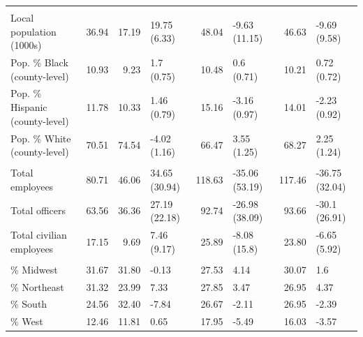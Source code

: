 \begin{table}
\begin{tabular}[t]{lrrlrlrl}
\addlinespace[0.3em]
\multicolumn{8}{l}{\textbf{Population}}\\
\hspace{1em}Local population (1000s) & 36.94 & 17.19 & 19.75 (6.33) & 48.04 & -9.63 (11.15) & 46.63 & -9.69 (9.58)\\
\hspace{1em}Pop. \% Black (county-level) & 10.93 & 9.23 & 1.7 (0.75) & 10.48 & 0.6 (0.71) & 10.21 & 0.72 (0.72)\\
\hspace{1em}Pop. \% Hispanic (county-level) & 11.78 & 10.33 & 1.46 (0.79) & 15.16 & -3.16 (0.97) & 14.01 & -2.23 (0.92)\\
\hspace{1em}Pop. \% White (county-level) & 70.51 & 74.54 & -4.02 (1.16) & 66.47 & 3.55 (1.25) & 68.27 & 2.25 (1.24)\\
\addlinespace[0.3em]
\multicolumn{8}{l}{\textbf{Department size (\# of employees)}}\\
\hspace{1em}Total employees & 80.71 & 46.06 & 34.65 (30.94) & 118.63 & -35.06 (53.19) & 117.46 & -36.75 (32.04)\\
\hspace{1em}Total officers & 63.56 & 36.36 & 27.19 (22.18) & 92.74 & -26.98 (38.09) & 93.66 & -30.1 (26.91)\\
\hspace{1em}Total civilian employees & 17.15 & 9.69 & 7.46 (9.17) & 25.89 & -8.08 (15.8) & 23.80 & -6.65 (5.92)\\
\addlinespace[0.3em]
\multicolumn{8}{l}{\textbf{Census region}}\\
\hspace{1em}\% Midwest & 31.67 & 31.80 & -0.13 & 27.53 & 4.14 & 30.07 & 1.6\\
\hspace{1em}\% Northeast & 31.32 & 23.99 & 7.33 & 27.85 & 3.47 & 26.95 & 4.37\\
\hspace{1em}\% South & 24.56 & 32.40 & -7.84 & 26.67 & -2.11 & 26.95 & -2.39\\
\hspace{1em}\% West & 12.46 & 11.81 & 0.65 & 17.95 & -5.49 & 16.03 & -3.57\\
\bottomrule
\end{tabular}
\end{table}

